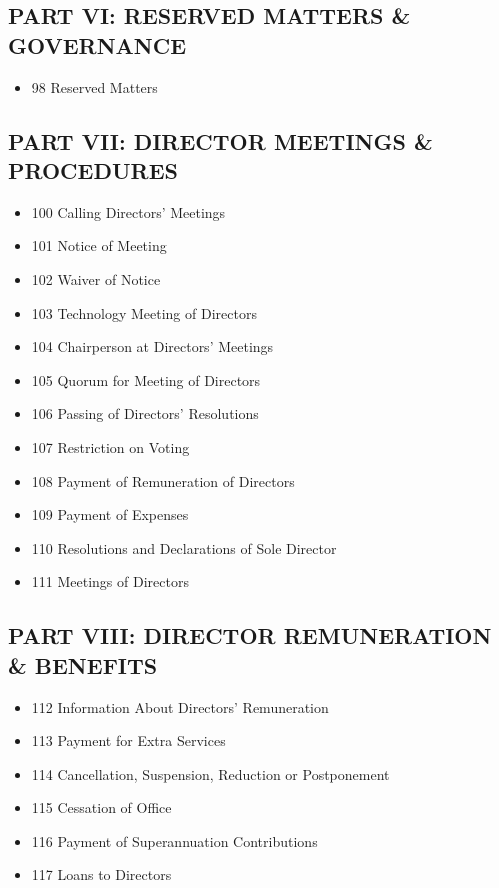 \subsection*{PART VI: RESERVED MATTERS \& GOVERNANCE}
\begin{itemize}[leftmargin=1em]
    \item 98 Reserved Matters
\end{itemize}

\subsection*{PART VII: DIRECTOR MEETINGS \& PROCEDURES}
\begin{itemize}[leftmargin=1em]
    \item 100 Calling Directors' Meetings
    \item 101 Notice of Meeting
    \item 102 Waiver of Notice
    \item 103 Technology Meeting of Directors
    \item 104 Chairperson at Directors' Meetings
    \item 105 Quorum for Meeting of Directors
    \item 106 Passing of Directors' Resolutions
    \item 107 Restriction on Voting
    \item 108 Payment of Remuneration of Directors
    \item 109 Payment of Expenses
    \item 110 Resolutions and Declarations of Sole Director
    \item 111 Meetings of Directors
\end{itemize}

\subsection*{PART VIII: DIRECTOR REMUNERATION \& BENEFITS}
\begin{itemize}[leftmargin=1em]
    \item 112 Information About Directors' Remuneration
    \item 113 Payment for Extra Services
    \item 114 Cancellation, Suspension, Reduction or Postponement
    \item 115 Cessation of Office
    \item 116 Payment of Superannuation Contributions
    \item 117 Loans to Directors
\end{itemize}

